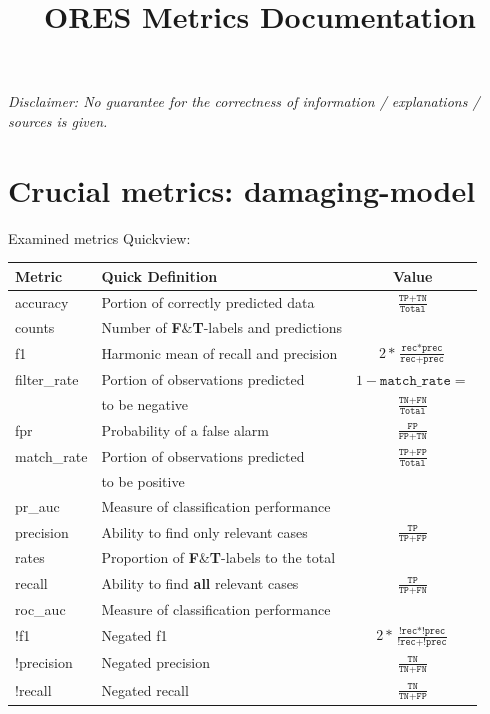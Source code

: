 \documentclass[12pt,a4paper]{article}
\title{ORES Metrics Documentation}
\date{}
\begin{document}
\maketitle
\textit{Disclaimer: No guarantee for the correctness of information / explanations / sources is given.}\\
%
\section{Crucial metrics: \textbf{damaging}-model}
Examined metrics Quickview:\\

\begin{tabular}{|l|l|c|}
\hline
\textbf{Metric} & \textbf{Quick Definition} & \textbf{Value}\\\hline \hline
accuracy & Portion of correctly predicted data & $\frac{\texttt{TP}+\texttt{TN}}{\texttt{Total}}$\\\hline
counts & Number of \textbf{F}\&\textbf{T}-labels and predictions&\\\hline
f1 & Harmonic mean of recall and precision & $2*\frac{\texttt{rec} * \texttt{prec}}{\texttt{rec}+\texttt{prec}}$\\\hline
filter\_rate & Portion of observations predicted & $1-\texttt{match\_rate} =$\\ &to be negative&$\frac{\texttt{TN}+\texttt{FN}}{\texttt{Total}}$\\\hline
fpr & Probability of a false alarm & $\frac{\texttt{FP}}{\texttt{FP} + \texttt{TN}}$\\\hline
match\_rate & Portion of observations predicted & $\frac{\texttt{TP}+\texttt{FP}}{\texttt{Total}}$\\ &to be positive&\\\hline
pr\_auc & Measure of classification performance &\\\hline
precision & Ability to find only relevant cases & $\frac{\texttt{TP}}{\texttt{TP} + \texttt{FP}}$\\\hline
rates & Proportion of \textbf{F}\&\textbf{T}-labels to the total&\\\hline
recall & Ability to find \textbf{all} relevant cases & $\frac{\texttt{TP}}{\texttt{TP} + \texttt{FN}}$\\\hline
roc\_auc & Measure of classification performance &\\\hline
!f1 & Negated f1 & $2*\frac{\texttt{!rec} * \texttt{!prec}}{\texttt{!rec}+\texttt{!prec}}$\\\hline
!precision & Negated precision & $\frac{\texttt{TN}}{\texttt{TN} + \texttt{FN}}$ \\\hline
!recall & Negated recall & $\frac{\texttt{TN}}{\texttt{TN} + \texttt{FP}}$\\\hline
\end{tabular}\\ \\
\end{document}
